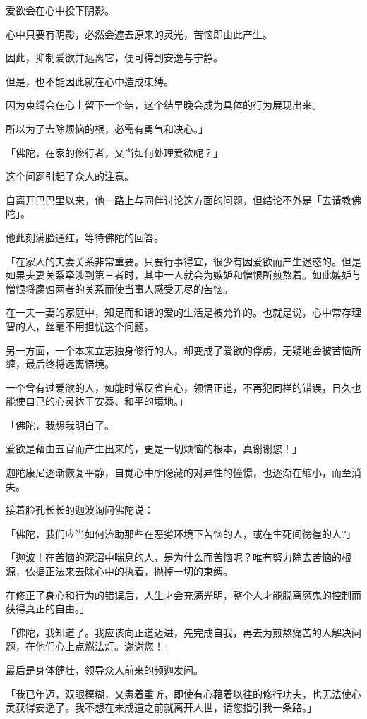 \documentclass[twoside,openany]{book}
\begin{document}
爱欲会在心中投下阴影。

心中只要有阴影，必然会遮去原来的灵光，苦恼即由此产生。

因此，抑制爱欲并远离它，便可得到安逸与宁静。

但是，也不能因此就在心中造成束缚。

因为束缚会在心上留下一个结，这个结早晚会成为具体的行为展现出来。

所以为了去除烦恼的根，必需有勇气和决心。」

「佛陀，在家的修行者，又当如何处理爱欲呢？」

这个问题引起了众人的注意。

自离开巴巴里以来，他一路上与同伴讨论这方面的问题，但结论不外是「去请教佛陀」。

他此刻满脸通红，等待佛陀的回答。

「在家人的夫妻关系非常重要。只要行事得宜，很少有因爱欲而产生迷惑的。但是如果夫妻关系牵涉到第三者时，其中一人就会为嫉妒和憎恨所煎熬着。如此嫉妒与憎恨将腐蚀两者的关系而使当事人感受无尽的苦恼。

在一夫一妻的家庭中，知足而和谐的爱的生活是被允许的。也就是说，心中常存理智的人，丝毫不用担忧这个问题。

另一方面，一个本来立志独身修行的人，却变成了爱欲的俘虏，无疑地会被苦恼所缠，最后终将远离悟境。

一个曾有过爱欲的人，如能时常反省自心，领悟正道，不再犯同样的错误，日久也能使自己的心灵达于安泰、和平的境地。」

「佛陀，我想我明白了。

爱欲是藉由五官而产生出来的，更是一切烦恼的根本，真谢谢您！」

迦陀康尼逐渐恢复平静，自觉心中所隐藏的对异性的憧憬，也逐渐在缩小，而至消失。

接着脸孔长长的迦波询问佛陀说：

「佛陀，我们应当如何济助那些在恶劣环境下苦恼的人，或在生死间徬徨的人?」

「迦波！在苦恼的泥沼中喘息的人，是为什么而苦恼呢？唯有努力除去苦恼的根源，依据正法来去除心中的执着，抛掉一切的束缚。

在修正了身心和行为的错误后，人生才会充满光明，整个人才能脱离魔鬼的控制而获得真正的自由。」

「佛陀，我知道了。我应该向正道迈进，先完成自我，再去为煎熬痛苦的人解决问题，在他们心上点燃法灯。谢谢您！」

最后是身体健壮，领导众人前来的频迦发问。

「我已年迈，双眼模糊，又患着重听，即使有心藉着以往的修行功夫，也无法使心灵获得安逸了。我不想在未成道之前就离开人世，请您指引我一条路。」
\end{document}
